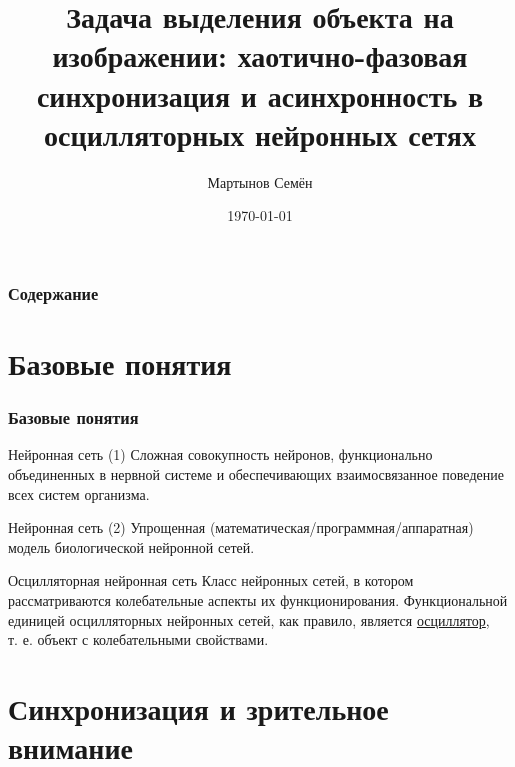 \documentclass{beamer}
\title[Интеллектуальные системы]{Задача выделения объекта на изображении: хаотично-фазовая синхронизация и асинхронность в осцилляторных нейронных сетях}
\author{Мартынов Семён}
\institute[СПб ПУ]
{
Санкт-Петербургский государственный политехнический университет \\
\medskip
\textit{semen.martynov@gmail.com}
}
\date{\today}
\begin{document}
\begin{frame}
\titlepage
\end{frame}

\begin{frame}
\frametitle{Содержание}
\tableofcontents
\end{frame}

\section{Базовые понятия}

\begin{frame}
\frametitle{Базовые понятия}
\begin{block}{Нейронная сеть (1)}
Сложная совокупность нейронов, функционально объединенных в нервной системе и обеспечивающих взаимосвязанное поведение всех систем организма.
\end{block}

\begin{block}{Нейронная сеть (2)}
Упрощенная (математическая/программная/аппаратная) модель биологической нейронной сетей.
\end{block}

\begin{block}{Осцилляторная нейронная сеть}
Класс нейронных сетей, в котором рассматриваются колебательные аспекты их функционирования. Функциональной единицей осцилляторных нейронных сетей, как правило, является \underline{осциллятор},\\т. е. объект с колебательными свойствами. 
\end{block}
\end{frame}

\section{Синхронизация и зрительное внимание}
\end{document}
